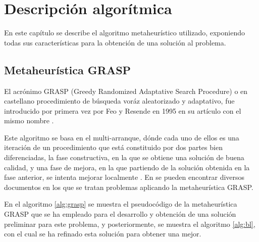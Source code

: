 
\chapter{Descripción algorítmica} %

\label{Chapter3}

En este capítulo se describe el algoritmo metaheurístico utilizado, exponiendo todas sus características para la obtención de una solución al problema.

\section{Metaheurística GRASP}
\label{sec_metaGrasp}
El acrónimo \gls{GRASP} (Greedy Randomized Adaptative Search Procedure) o en castellano procedimiento de búsqueda voráz aleatorizado y adaptativo, fue introducido por primera vez por Feo y Resende en 1995 en su artículo con el mismo nombre \cite{grasp-feo-resende}.

Este algoritmo se basa en el multi-arranque, dónde cada uno de ellos es una iteración de un procedimiento que está constituido por dos partes bien diferenciadas, la fase constructiva, en la que se obtiene una solución de buena calidad, y una fase de mejora, en la que partiendo de la solución obtenida en la fase anterior, se intenta mejorar localmente \cite{libro-metaheuristicas}. 
En \cite{grasp-flightrecoveryproblem} \cite{grasp-parallel} \cite{grasp-weapon} \cite{grasp-empaquetado} \cite{grasp-ruta} \cite{grasp-vertex} se pueden encontrar diversos documentos en los que se tratan problemas aplicando la metaheurística \gls{GRASP}.

En el algoritmo \ref{alg:grasp} se muestra el pseudocódigo de la metaheurística \gls{GRASP} que se ha empleado para el desarrollo y obtención de una solución preliminar para este problema, y posteriormente, se muestra el algoritmo \ref{alg:bl}, con el cual se ha refinado esta solución para obtener una mejor.\\

